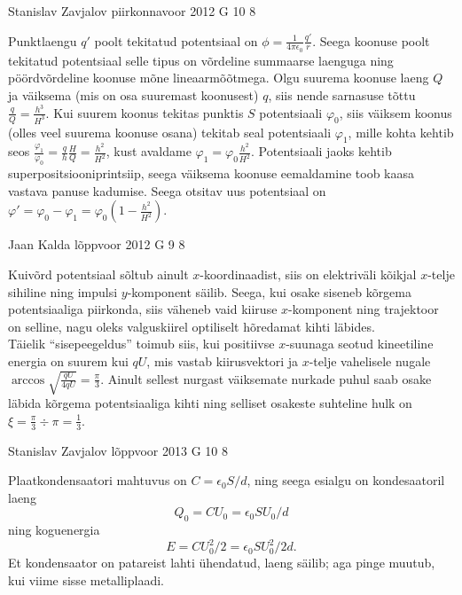 \documentclass[11pt, twoside]{article}
\begin{document}
{%
{Stanislav Zavjalov} %
{piirkonnavoor} %
{2012} %
{G 10} %
{8} %
{

\ifSolution
Punktlaengu $q'$ poolt tekitatud potentsiaal on $\phi = \frac{1}{4 \pi \epsilon_0} \frac{q'}{r}$. Seega koonuse poolt tekitatud potentsiaal selle tipus on võrdeline summaarse laenguga ning pöördvõrdeline koonuse mõne lineaarmõõtmega. Olgu suurema koonuse laeng $Q$ ja väiksema (mis on osa suuremast koonusest) $q$, siis nende sarnasuse tõttu $\frac{q}{Q} = \frac{h^3}{H^3}$. Kui suurem koonus tekitas punktis $S$ potentsiaali $\varphi_0$, siis väiksem koonus (olles veel suurema koonuse osana) tekitab seal potentsiaali $\varphi_1$, mille kohta kehtib seos $\frac{\varphi_1}{\varphi_0} = \frac{q}{h} \frac{H}{Q} = \frac{h^2}{H^2}$, kust avaldame $\varphi_1 = \varphi_0 \frac{h^2}{H^2}$. Potentsiaali jaoks kehtib superpositsiooniprintsiip, seega väiksema koonuse eemaldamine toob kaasa vastava panuse kadumise. Seega otsitav uus potentsiaal on $\varphi' = \varphi_0 - \varphi_1 = \varphi_0 ( 1 - \frac{h^2}{H^2})$.
\fi
}

{Jaan Kalda} %
{lõppvoor} %
{2012} %
{G 9} %
{8} %
{

\ifSolution
\osa Kuivõrd potentsiaal sõltub ainult $x$-koordinaadist, siis on elektriväli kõikjal $x$-telje sihiline ning
impulsi $y$-komponent säilib. Seega, kui osake siseneb kõrgema potentsiaaliga piirkonda, siis 
väheneb vaid kiiruse $x$-komponent ning
trajektoor on selline, nagu oleks valguskiirel optiliselt hõredamat kihti läbides.\\
\osa Täielik \enquote{sisepeegeldus} toimub siis, kui positiivse $x$-suunaga 
seotud kineetiline energia on suurem kui $qU$, mis vastab kiirusvektori 
ja $x$-telje vahelisele nugale $\arccos \sqrt{\frac {qU}{4qU}}=\frac \pi 3$. Ainult sellest nurgast väiksemate nurkade puhul saab osake läbida kõrgema 
potentsiaaliga kihti ning selliset osakeste suhteline hulk on $\xi = \frac \pi 3 \div \pi = \frac 13$.
\fi
}

{Stanislav Zavjalov} %
{lõppvoor} %
{2013} %
{G 10} %
{8} %
{

\ifSolution
Plaatkondensaatori mahtuvus on $C = \epsilon_0 S / d$, ning seega esialgu on kondesaatoril laeng $$Q_0 = C U_0 = \epsilon_0 S U_0/ d$$ ning koguenergia $$E = C U_0^2 / 2 = \epsilon_0 S U_0^2/ 2 d.$$Et kondensaator on patareist lahti ühendatud, laeng säilib; aga pinge muutub, kui viime sisse metalliplaadi.

}}
\end{document}
